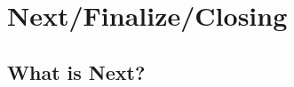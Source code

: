 \newpage\null\thispagestyle{empty}\newpage
\clearpage{\thispagestyle{empty}\cleardoublepage}
\part{Next/Finalize/Closing}
% 
% 
% 
\setcounter{chapter}{9}
\chapter{What is Next?}
\label{sec:outlook}
% 
